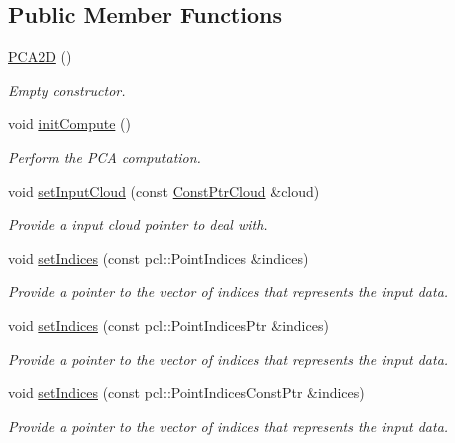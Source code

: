 \subsection*{Public Member Functions}
\begin{DoxyCompactItemize}
\item 
\hyperlink{classPCA2D_a30d944a9dc80740707c532cabe91ebdf}{P\+C\+A2D} ()
\begin{DoxyCompactList}\small\item\em Empty constructor. \end{DoxyCompactList}\item 
void \hyperlink{classPCA2D_a80df2e612db722f630d4c48a9a71f651}{init\+Compute} ()
\begin{DoxyCompactList}\small\item\em Perform the P\+CA computation. \end{DoxyCompactList}\item 
void \hyperlink{classPCA2D_ad3583e82b8d9b97f3f7253fd78af1dcc}{set\+Input\+Cloud} (const \hyperlink{Normal2dEstimation_8h_a389a43addc496dc19a5bb0575cc60bc4}{Const\+Ptr\+Cloud} \&cloud)
\begin{DoxyCompactList}\small\item\em Provide a input cloud pointer to deal with. \end{DoxyCompactList}\item 
void \hyperlink{classPCA2D_af6c41fea17b2a9debbef5c88dc963f1e}{set\+Indices} (const pcl\+::\+Point\+Indices \&indices)
\begin{DoxyCompactList}\small\item\em Provide a pointer to the vector of indices that represents the input data. \end{DoxyCompactList}\item 
void \hyperlink{classPCA2D_a0b214db07c98537f683bb69a7e9d9271}{set\+Indices} (const pcl\+::\+Point\+Indices\+Ptr \&indices)
\begin{DoxyCompactList}\small\item\em Provide a pointer to the vector of indices that represents the input data. \end{DoxyCompactList}\item 
void \hyperlink{classPCA2D_a51c7a6bcf7c77af6d81d98a0bb0186a6}{set\+Indices} (const pcl\+::\+Point\+Indices\+Const\+Ptr \&indices)
\begin{DoxyCompactList}\small\item\em Provide a pointer to the vector of indices that represents the input data. \end{DoxyCompactList}\item 

\end{DoxyCompactItemize}

